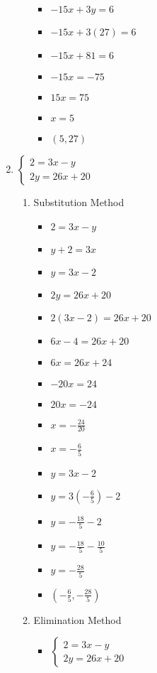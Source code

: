 \documentclass{article}
\begin{document}
\begin{enumerate}
\begin{enumerate}
\begin{itemize}
    \item $-15x+3y=6$
    \item $-15x+3(27)=6$
    \item $-15x+81=6$
    \item $-15x=-75$
    \item $15x=75$
    \item $x=5$
    \item $(5,27)$
    \end{itemize}
  \end{enumerate}
\item $\left\{ \begin{array}{l}
      2=3x-y \\
      2y=26x+20 \end{array} \right.$
  \begin{enumerate}
  \item Substitution Method
    \begin{itemize}
    \item $2=3x-y$
    \item $y+2=3x$
    \item $y=3x-2$
    \item $2y=26x+20$
    \item $2(3x-2)=26x+20$
    \item $6x-4=26x+20$
    \item $6x=26x+24$
    \item $-20x=24$
    \item $20x=-24$
    \item {\Large $x=-\frac{24}{20}$}
    \item {\Large $x=-\frac{6}{5}$}
    \item $y=3x-2$
    \item {\Large $y=3\left(-\frac{6}{5}\right)-2$}
    \item {\Large $y=-\frac{18}{5}-2$}
    \item {\Large $y=-\frac{18}{5}-\frac{10}{5}$}
    \item {\Large $y=-\frac{28}{5}$}
    \item {\Large $\left(-\frac{6}{5},-\frac{28}{5}\right)$}
    \end{itemize}
  \item Elimination Method
    \begin{itemize}
    \item $\left\{ \begin{array}{l}
          2=3x-y \\
          2y=26x+20 \end{array} \right.$

\end{itemize}
\end{enumerate}
\end{enumerate}
\end{document}
